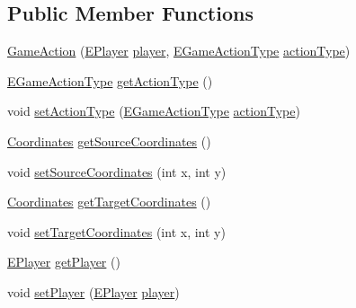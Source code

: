 \subsection*{Public Member Functions}
\begin{DoxyCompactItemize}
\item 
\mbox{\hyperlink{classrule_engine_1_1_game_action_ac1dd0eb1f6d319aa4ce0e59a1454355b}{Game\+Action}} (\mbox{\hyperlink{enumgame_1_1_e_player}{E\+Player}} \mbox{\hyperlink{classrule_engine_1_1_game_action_a966cfb64533d4cbe0ca5233ed642719d}{player}}, \mbox{\hyperlink{enumrule_engine_1_1_e_game_action_type}{E\+Game\+Action\+Type}} \mbox{\hyperlink{classrule_engine_1_1_game_action_a385c48464866d2cd11bdf90323e52df8}{action\+Type}})
\item 
\mbox{\hyperlink{enumrule_engine_1_1_e_game_action_type}{E\+Game\+Action\+Type}} \mbox{\hyperlink{classrule_engine_1_1_game_action_a2d0b79903ec9cee2d06bf21ccd024d92}{get\+Action\+Type}} ()
\item 
void \mbox{\hyperlink{classrule_engine_1_1_game_action_a3337a150ac049db623ec6e96dcfa3ff3}{set\+Action\+Type}} (\mbox{\hyperlink{enumrule_engine_1_1_e_game_action_type}{E\+Game\+Action\+Type}} \mbox{\hyperlink{classrule_engine_1_1_game_action_a385c48464866d2cd11bdf90323e52df8}{action\+Type}})
\item 
\mbox{\hyperlink{classrule_engine_1_1_coordinates}{Coordinates}} \mbox{\hyperlink{classrule_engine_1_1_game_action_a27182b152911857a0f87e4977e2246f1}{get\+Source\+Coordinates}} ()
\item 
void \mbox{\hyperlink{classrule_engine_1_1_game_action_a606ab317d79faf03aba37638bdc23cd6}{set\+Source\+Coordinates}} (int x, int y)
\item 
\mbox{\hyperlink{classrule_engine_1_1_coordinates}{Coordinates}} \mbox{\hyperlink{classrule_engine_1_1_game_action_ade50aef53ec161c2f0976f38d1ed006c}{get\+Target\+Coordinates}} ()
\item 
void \mbox{\hyperlink{classrule_engine_1_1_game_action_ace03895cc8a7061ecd2af09156cead26}{set\+Target\+Coordinates}} (int x, int y)
\item 
\mbox{\hyperlink{enumgame_1_1_e_player}{E\+Player}} \mbox{\hyperlink{classrule_engine_1_1_game_action_acd7a1a123d274d486d2696ef56df0f01}{get\+Player}} ()
\item 
void \mbox{\hyperlink{classrule_engine_1_1_game_action_a82419831fe1e365ea8a19d1ead0f9046}{set\+Player}} (\mbox{\hyperlink{enumgame_1_1_e_player}{E\+Player}} \mbox{\hyperlink{classrule_engine_1_1_game_action_a966cfb64533d4cbe0ca5233ed642719d}{player}})
\end{DoxyCompactItemize}
